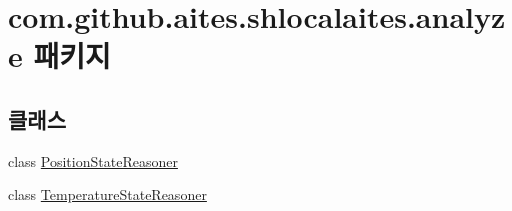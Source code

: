 \hypertarget{namespacecom_1_1github_1_1aites_1_1shlocalaites_1_1analyze}{}\section{com.\+github.\+aites.\+shlocalaites.\+analyze 패키지}
\label{namespacecom_1_1github_1_1aites_1_1shlocalaites_1_1analyze}
\subsection*{클래스}
\begin{DoxyCompactItemize}
\item 
class \mbox{\hyperlink{classcom_1_1github_1_1aites_1_1shlocalaites_1_1analyze_1_1_position_state_reasoner}{Position\+State\+Reasoner}}
\item 
class \mbox{\hyperlink{classcom_1_1github_1_1aites_1_1shlocalaites_1_1analyze_1_1_temperature_state_reasoner}{Temperature\+State\+Reasoner}}
\end{DoxyCompactItemize}
